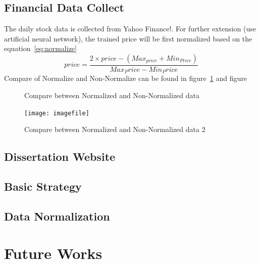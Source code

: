 \documentclass[12pt,a4paper]{scrartcl}
\begin{document}
	\subsection{Financial Data Collect}
	The daily stock data is collected from Yahoo Finance!. For further extension (use artificial neural network\cite{nayak2014impact}), the trained price will be first normalized based on the equation~\ref{eq:normalize}
	\begin{equation}
		\label{eq:normalize}
		price = \frac{2\times price - (Max_{price}+Min_{Price})}{Max_Price-Min_Price}
	\end{equation}
	Compare of Normalize and Non-Normalize can be found in figure~\ref{fig:non_vs_nor} and figure
	\begin{figure}[ht]
		\centering
		\caption{Compare between Normalized and Non-Normalized data}
		\label{fig:non_vs_nor}
	\end{figure}
	\begin{figure}[ht]
		\centering
		\texttt{[image: imagefile]}
		\caption{Compare between Normalized and Non-Normalized data 2}
		\label{fig:mse_mad}
	\end{figure}
	\subsection{Dissertation Website}
	\subsection{Basic Strategy}
	\subsection{Data Normalization}
	\section{Future Works}
	
\end{document}
